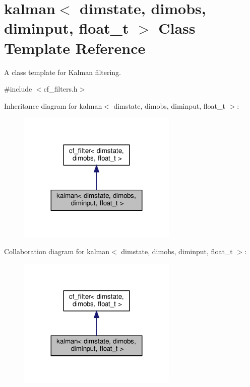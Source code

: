 \hypertarget{classkalman}{}\section{kalman$<$ dimstate, dimobs, diminput, float\+\_\+t $>$ Class Template Reference}
\label{classkalman}


A class template for Kalman filtering.  




{\ttfamily \#include $<$cf\+\_\+filters.\+h$>$}



Inheritance diagram for kalman$<$ dimstate, dimobs, diminput, float\+\_\+t $>$\+:\nopagebreak
\begin{figure}[H]
\begin{center}
\leavevmode
\includegraphics[width=215pt]{classkalman__inherit__graph}
\end{center}
\end{figure}


Collaboration diagram for kalman$<$ dimstate, dimobs, diminput, float\+\_\+t $>$\+:\nopagebreak
\begin{figure}[H]
\begin{center}
\leavevmode
\includegraphics[width=215pt]{classkalman__coll__graph}
\end{center}
\end{figure}
